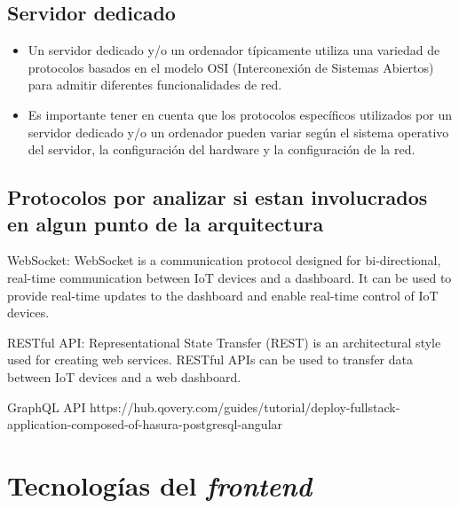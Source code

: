 \subsection{Servidor dedicado}


\begin{itemize}

  \item Un servidor dedicado y/o un ordenador típicamente utiliza una variedad de protocolos basados en el modelo OSI (Interconexión de Sistemas Abiertos) para admitir diferentes funcionalidades de red. 

  \item Es importante tener en cuenta que los protocolos específicos utilizados por un servidor dedicado y/o un ordenador pueden variar según el sistema operativo del servidor, la configuración del hardware y la configuración de la red.

\end{itemize}


\subsection{Protocolos por analizar si estan involucrados en algun punto de la arquitectura}


WebSocket: WebSocket is a communication protocol designed for bi-directional, real-time communication between IoT devices and a dashboard. It can be used to provide real-time updates to the dashboard and enable real-time control of IoT devices.

RESTful API: Representational State Transfer (REST) is an architectural style used for creating web services. RESTful APIs can be used to transfer data between IoT devices and a web dashboard.

GraphQL API https://hub.qovery.com/guides/tutorial/deploy-fullstack-application-composed-of-hasura-postgresql-angular



\section{Tecnologías del \textit{frontend}}

